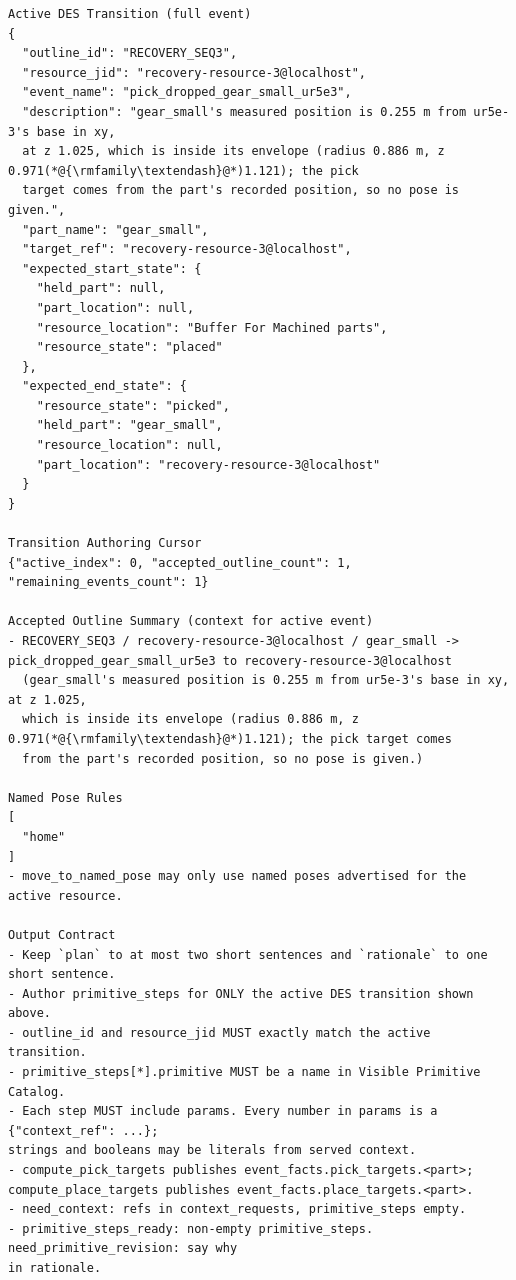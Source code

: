 \documentclass[preprint,12pt,authoryear]{elsarticle}
\begin{document}
\begin{lstlisting}[style=recorded]
Active DES Transition (full event)
{
  "outline_id": "RECOVERY_SEQ3",
  "resource_jid": "recovery-resource-3@localhost",
  "event_name": "pick_dropped_gear_small_ur5e3",
  "description": "gear_small's measured position is 0.255 m from ur5e-3's base in xy,
  at z 1.025, which is inside its envelope (radius 0.886 m, z 0.971(*@{\rmfamily\textendash}@*)1.121); the pick
  target comes from the part's recorded position, so no pose is given.",
  "part_name": "gear_small",
  "target_ref": "recovery-resource-3@localhost",
  "expected_start_state": {
    "held_part": null,
    "part_location": null,
    "resource_location": "Buffer For Machined parts",
    "resource_state": "placed"
  },
  "expected_end_state": {
    "resource_state": "picked",
    "held_part": "gear_small",
    "resource_location": null,
    "part_location": "recovery-resource-3@localhost"
  }
}

Transition Authoring Cursor
{"active_index": 0, "accepted_outline_count": 1, "remaining_events_count": 1}

Accepted Outline Summary (context for active event)
- RECOVERY_SEQ3 / recovery-resource-3@localhost / gear_small ->
pick_dropped_gear_small_ur5e3 to recovery-resource-3@localhost
  (gear_small's measured position is 0.255 m from ur5e-3's base in xy, at z 1.025,
  which is inside its envelope (radius 0.886 m, z 0.971(*@{\rmfamily\textendash}@*)1.121); the pick target comes
  from the part's recorded position, so no pose is given.)

Named Pose Rules
[
  "home"
]
- move_to_named_pose may only use named poses advertised for the active resource.

Output Contract
- Keep `plan` to at most two short sentences and `rationale` to one short sentence.
- Author primitive_steps for ONLY the active DES transition shown above.
- outline_id and resource_jid MUST exactly match the active transition.
- primitive_steps[*].primitive MUST be a name in Visible Primitive Catalog.
- Each step MUST include params. Every number in params is a {"context_ref": ...};
strings and booleans may be literals from served context.
- compute_pick_targets publishes event_facts.pick_targets.<part>;
compute_place_targets publishes event_facts.place_targets.<part>.
- need_context: refs in context_requests, primitive_steps empty.
- primitive_steps_ready: non-empty primitive_steps. need_primitive_revision: say why
in rationale.


\end{lstlisting}
\end{document}
